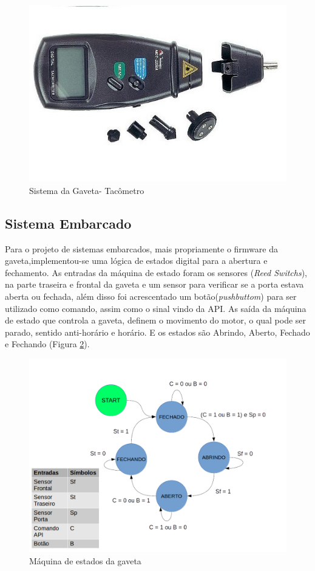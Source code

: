 \begin{figure}[!htb]
	\centering
	\includegraphics[scale=0.35]{figuras/5.jpg} 
	\caption{Sistema da Gaveta- Tacômetro}
	\label{Rotulo}
\end{figure}

\subsection{Sistema Embarcado}


Para o projeto de sistemas embarcados, mais propriamente o firmware da gaveta,implementou-se uma lógica de estados digital para a abertura e fechamento. As entradas da máquina de estado foram os sensores (\textit{Reed Switchs}), na parte traseira e frontal da gaveta e um sensor para verificar se a porta estava aberta ou fechada, além disso foi acrescentado um botão(\textit{pushbuttom}) para ser utilizado como comando, assim como o sinal vindo da API. As saída da máquina de estado que controla a gaveta, definem o movimento do motor, o qual pode ser parado, sentido anti-horário e horário. E os estados são Abrindo, Aberto, Fechado e Fechando (Figura \ref{maquina_gaveta}).

\begin{figure}[!htb]
	\centering
	\includegraphics[scale=0.35]{figuras/Maquina_Gaveta.png} 
	\caption{Máquina de estados da gaveta}
	\label{maquina_gaveta}
\end{figure}  

